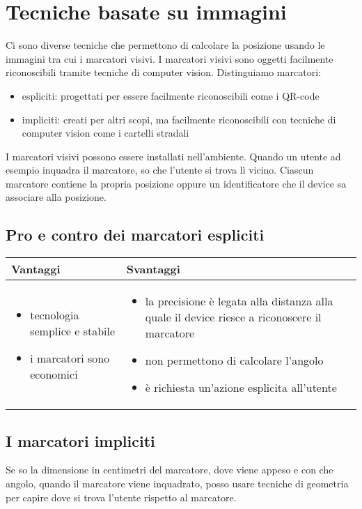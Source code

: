 \section{Tecniche basate su immagini}
Ci sono diverse tecniche che permettono di calcolare la posizione usando le immagini tra cui i marcatori visivi.
I marcatori visivi sono oggetti facilmente riconoscibili tramite tecniche di computer vision. Distinguiamo marcatori:
\begin{itemize}
    \item espliciti: progettati per essere facilmente riconoscibili come i QR-code
    \item impliciti: creati per altri scopi, ma facilmente riconoscibili con tecniche di computer vision come i cartelli stradali
\end{itemize}

I marcatori visivi possono essere installati nell'ambiente. Quando un utente ad esempio inquadra il marcatore, so che l'utente si trova lì vicino. Ciascun marcatore contiene la propria posizione oppure un identificatore che il device sa associare alla posizione. 

\subsection{Pro e contro dei marcatori espliciti}
\begin{table}[!ht]
    \centering
    \begin{tabular}{p{}|p{}}
        \textbf{Vantaggi} & \textbf{Svantaggi} \\
        \hline
        \begin{itemize}
            \item tecnologia semplice e stabile 
            \item i marcatori sono economici
        \end{itemize} & 
        \begin{itemize}
            \item la precisione è legata alla distanza alla quale il device riesce a riconoscere il marcatore
            \item non permettono di calcolare l'angolo
            \item è richiesta un'azione esplicita all'utente
        \end{itemize}
    \end{tabular}
\end{table}

\subsection{I marcatori impliciti}
Se so la dimensione in centimetri del marcatore, dove viene appeso e con che angolo, quando il marcatore viene inquadrato, posso usare tecniche di geometria per capire dove si trova l'utente rispetto al marcatore. 

